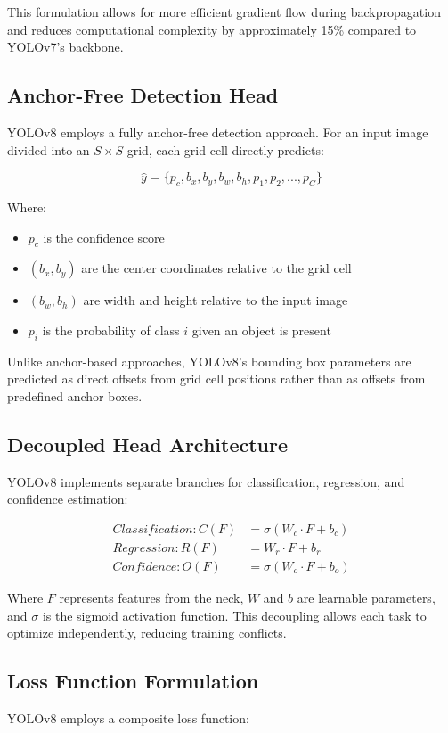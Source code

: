 \documentclass[11pt]{article}
\begin{document}
This formulation allows for more efficient gradient flow during backpropagation and reduces computational complexity by approximately 15\% compared to YOLOv7's backbone.

\subsection{Anchor-Free Detection Head}
YOLOv8 employs a fully anchor-free detection approach. For an input image divided into an $S \times S$ grid, each grid cell directly predicts:

\begin{equation}
\hat{y} = \{p_c, b_x, b_y, b_w, b_h, p_1, p_2, ..., p_C\}
\end{equation}

Where:
\begin{itemize}
\item $p_c$ is the confidence score
\item $(b_x, b_y)$ are the center coordinates relative to the grid cell
\item $(b_w, b_h)$ are width and height relative to the input image
\item $p_i$ is the probability of class $i$ given an object is present
\end{itemize}

Unlike anchor-based approaches, YOLOv8's bounding box parameters are predicted as direct offsets from grid cell positions rather than as offsets from predefined anchor boxes.

\subsection{Decoupled Head Architecture}
YOLOv8 implements separate branches for classification, regression, and confidence estimation:

\begin{align}
Classification: C(F) &= \sigma(W_c \cdot F + b_c) \\
Regression: R(F) &= W_r \cdot F + b_r \\
Confidence: O(F) &= \sigma(W_o \cdot F + b_o)
\end{align}

Where $F$ represents features from the neck, $W$ and $b$ are learnable parameters, and $\sigma$ is the sigmoid activation function. This decoupling allows each task to optimize independently, reducing training conflicts.

\subsection{Loss Function Formulation}
YOLOv8 employs a composite loss function:
\end{document}
